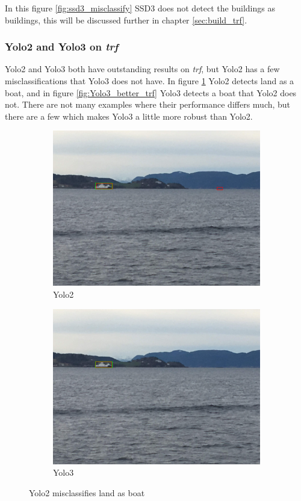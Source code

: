 In this figure \ref{fig:ssd3_misclassify} SSD3 does not detect the buildings as buildings, this will be discussed further in chapter \ref{sec:build_trf}.

\vspace{3mm}

\subsubsection{Yolo2 and Yolo3 on \textit{trf}}

Yolo2 and Yolo3 both have outstanding results on \textit{trf}, but Yolo2 has a few misclassifications that Yolo3 does not have. In figure \ref{fig:yolo2_misclassify} Yolo2 detects land as a boat, and in figure \ref{fig:Yolo3_better_trf} Yolo3 detects a boat that Yolo2 does not. There are not many examples where their performance differs much, but there are a few which makes Yolo3 a little more robust than Yolo2.

\begin{figure}[h!]
\begin{subfigure}{.5\textwidth}
  \centering
  \includegraphics[width=0.8\linewidth]{results/case_buildings/yolotrf/Yolo2/IMG_2300.jpg}
  \caption{Yolo2}
\end{subfigure}%
\begin{subfigure}{.5\textwidth}
  \centering
  \includegraphics[width=.8\linewidth]{results/case_buildings/yolotrf/Yolo3/IMG_2300.jpg}
  \caption{Yolo3}
\end{subfigure}
\caption{Yolo2 misclassifies land as boat}
\label{fig:yolo2_misclassify}
\end{figure}

